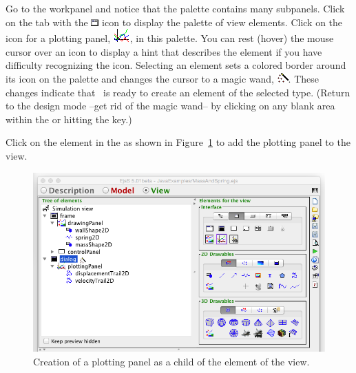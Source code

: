 Go to the  workpanel and notice that the  palette contains many subpanels.  Click on the tab
with the \includegraphics[scale=\linescale]{../_common/icons_png/Groups/Containers.png} icon to display the  palette of view elements.  Click on the icon for a plotting panel,
\includegraphics[scale=\linescale]{../_common/icons_png/Elements/PlottingPanel.png}, in this palette. You can rest (hover) the mouse
cursor over an icon to display a hint that describes the element if you have difficulty recognizing the icon.
Selecting an element sets a colored border around its icon on the palette and changes the cursor to a magic wand,
\includegraphics[scale=\linescale]{../_common/icons_png/create.png}. These changes indicate that \ejs\ is ready to create
an element of the selected type. (Return to the design mode --get rid of the magic wand-- by clicking on any
blank area within the  or hitting the  key.)

Click on the  element in the  as shown in
Figure~\ref{fig:02ExplorationJava/ModifyViewAddPlottingPanel} to add the plotting panel to the view.

\begin{figure}[htb]
    \centering
  \includegraphics[scale=\scale]{02ExplorationJava/images/ModifyViewAddPlottingPanel.png}
    \caption{Creation of a plotting panel as a child of the  element of the view.}
    \label{fig:02ExplorationJava/ModifyViewAddPlottingPanel}
\end{figure}

